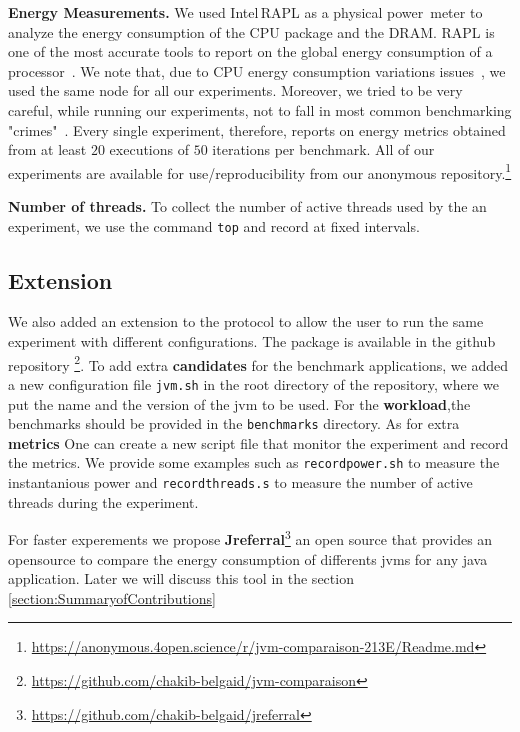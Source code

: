 \noindent\textbf{Energy Measurements.}
We used Intel\,RAPL as a physical power~meter to analyze the energy consumption of the CPU package and the DRAM.
RAPL is one of the most accurate tools to report on the global energy consumption of a processor~\cite{Khan:2018:RAE:3199681.3177754,10.1145/2989081.2989088}.
We note that, due to CPU energy consumption variations issues~\cite{opaper}, we used the same node for all our experiments.
Moreover, we tried to be very careful, while running our experiments, not to fall in most common benchmarking "crimes"~\cite{crimes}.
Every single experiment, therefore, reports on energy metrics obtained from at least $20$ executions of $50$ iterations per benchmark.
All of our experiments are available for use/reproducibility from our anonymous repository.\footnote{\url{https://anonymous.4open.science/r/jvm-comparaison-213E/Readme.md}}


\noindent\textbf{Number of threads.}
To collect the number of active threads used by the an experiment, we use the command \texttt{top} and record at fixed intervals.

\subsection{Extension}
We also added an extension to the protocol to allow the user to run the same experiment with different configurations. The package is available in the github repository \footnote{\url{https://github.com/chakib-belgaid/jvm-comparaison}}.
To add extra \textbf{candidates} for the benchmark applications, we added a new configuration file \texttt{jvm.sh} in the root directory of the repository, where we put the name and the version of the jvm to be used. 
For the \textbf{workload},the benchmarks should be provided in the \texttt{benchmarks} directory.
As for extra \textbf{metrics} One can create a new script file that monitor the experiment and record the metrics. We provide some examples such as \texttt{recordpower.sh} to measure the instantanious power and \texttt{recordthreads.s} to measure the number of active threads during the experiment.

For faster experements we propose \textbf{Jreferral}\footnote{\url{https://github.com/chakib-belgaid/jreferral}} an open source that provides an opensource to compare the energy consumption of differents jvms for any java application. Later we will discuss this tool in the section \ref{section:SummaryofContributions}





